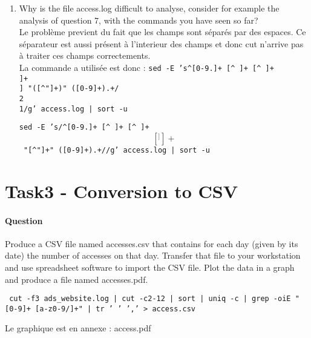 \documentclass[a4paper,11pt]{article}
\newcounter{commande}[subsection]
\newcommand{\question}[1]{\addtocounter{commande}{1}\paragraph{Question \arabic{commande}}#1\;}
\begin{document}
\begin{enumerate}
  
  \item Why is the file access.log difficult to analyse, consider for example the analysis of question 7, with the commands you have seen so far?  \\
  Le problème previent du fait que les champs sont séparés par des espaces. Ce séparateur est aussi présent à l'interieur des champs et donc cut n'arrive pas à traiter ces champs correctements. \\
  La commande a utilisée est donc : \texttt{sed -E 's\/^[0-9.]+ [^ ]+ [^ ]+ \\[[^]]+\\] "([^"]+)" ([0-9]+).+/\\2 \\1/g' access.log | sort -u}
  
  \texttt{sed -E 's/^[0-9.]+ [^ ]+ [^ ]+ \[[^]]+\] "[^"]+" ([0-9]+).+/\1/g' access.log | sort -u}
  
  
\end{enumerate}


\section{Task3 - Conversion to CSV}
\question{Produce a CSV file named accesses.csv that contains for each day (given by its date) the number of accesses on that day. Transfer that file to your workstation and use spreadsheet software to import the CSV file. Plot the data in a graph and produce a file named accesses.pdf.}

\texttt{ cut -f3 ads\_website.log | cut -c2-12 | sort | uniq -c | grep -oiE "[0-9]+ [a-z0-9/]+" | tr ' ' ',' > access.csv}

Le graphique est en annexe : access.pdf
\end{document}
